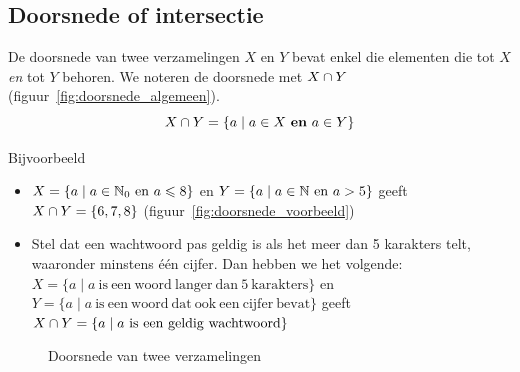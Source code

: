 \subsection{Doorsnede of intersectie}\index{\ensuremath{\intersection}}
De doorsnede van twee verzamelingen $X$ en $Y$ bevat enkel die elementen die tot $X$ \emph{en} tot $Y$ behoren. We noteren de doorsnede met $X\cap Y$ (figuur~\ref{fig:doorsnede_algemeen}).
\begin{equation*}
X\cap Y =\{a \mid a\in X ~\mathbf{en}~a\in Y \}
\end{equation*}

Bijvoorbeeld
\begin{itemize}
\item $X=\{a \mid a\in \mathbb{N}_0 ~\mathrm{en}~a\leqslant 8\}$ en $Y=\{a \mid a\in \mathbb{N} ~\mathrm{en}~a>5\}$ geeft $X\cap Y=\{6,7,8\}$ (figuur~\ref{fig:doorsnede_voorbeeld})
\item Stel dat een wachtwoord pas geldig is als het meer dan 5 karakters telt, waaronder minstens één cijfer. Dan hebben we het volgende: \\
$X=\{a\mid a ~\mathrm{is~een~woord~langer~dan~5~karakters} \}$ en \\$Y=\{a\mid a~ \mathrm{is~een~woord~dat~ook~een~cijfer~bevat } \}$ geeft \\
$X\cap Y=\{a \mid a~\mathrm{is~een~geldig~wachtwoord} \}$

\end{itemize}

\begin{figure}[htbp]
\centering
{}\qquad
\subfloat[$\{a \mid a\in \nat_0 ~\mathrm{en}~a\leqslant 8\}\intersection \{a \mid a\in \nat ~\mathrm{en}~a>5\}
	=\{6,7,8\}$]{

    \label{fig:doorsnede_voorbeeld}
}
\caption{Doorsnede van twee verzamelingen}
\end{figure}

